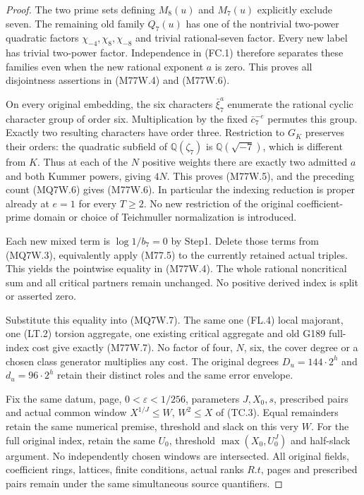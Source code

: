 \begin{proof}
The two prime sets defining $M_8(u)$ and $M_7(u)$ explicitly
exclude seven. The remaining old family $Q_7(u)$ has one of
the nontrivial two-power quadratic factors
$\chi_{-4},\chi_8,\chi_{-8}$ and trivial rational-seven factor.
Every new label has trivial two-power factor.
Independence in (FC.1) therefore separates these families
even when the new rational exponent $a$ is zero.
This proves all disjointness assertions in (M77W.4) and (M77W.6).

On every original embedding, the six characters $\bar\xi_7^a$
enumerate the rational cyclic character group of order six.
Multiplication by the fixed $\bar c_7^{-e}$ permutes this group.
Exactly two resulting characters have order three.
Restriction to $G_K$ preserves their orders: the quadratic
subfield of $\mathbb Q(\zeta_7)$ is $\mathbb Q(\sqrt{-7})$,
which is different from $K$.
Thus at each of the $N$ positive weights there are exactly
two admitted $a$ and both Kummer powers, giving $4N$.
This proves (M77W.5), and the preceding count (MQ7W.6)
gives (M77W.6). In particular the indexing reduction is
proper already at $e=1$ for every $T\geq2$.
No new restriction of the original coefficient-prime domain
or choice of Teichmuller normalization is introduced.

Each new mixed term is $\log1/b_7=0$ by Step1.
Delete those terms from (MQ7W.3), equivalently apply (M77.5)
to the currently retained actual triples. This yields the
pointwise equality in (M77W.4). The whole rational noncritical
sum and all critical partners remain unchanged.
No positive derived index is split or asserted zero.

Substitute this equality into (MQ7W.7). The same one (FL.4)
local majorant, one (LT.2) torsion aggregate, one existing
critical aggregate and old G189 full-index cost give
exactly (M77W.7). No factor of four, $N$, six, the cover
degree or a chosen class generator multiplies any cost.
The original degrees $D_u=144\cdot2^h$ and $d_u=96\cdot2^h$
retain their distinct roles and the same error envelope.

Fix the same datum, page, $0<\varepsilon<1/256$,
parameters $J,X_0,s$, prescribed pairs and actual common window
$X^{1/J}\leq W$, $W^2\leq X$ of (TC.3).
Equal remainders retain the same numerical premise, threshold
and slack on this very $W$. For the full original index,
retain the same $U_0$, threshold $\max(X_0,U_0^J)$ and
half-slack argument. No independently chosen windows are
intersected. All original fields, coefficient rings, lattices,
finite conditions, actual ranks $R.t$, pages and prescribed
pairs remain under the same simultaneous source quantifiers.
\end{proof}

